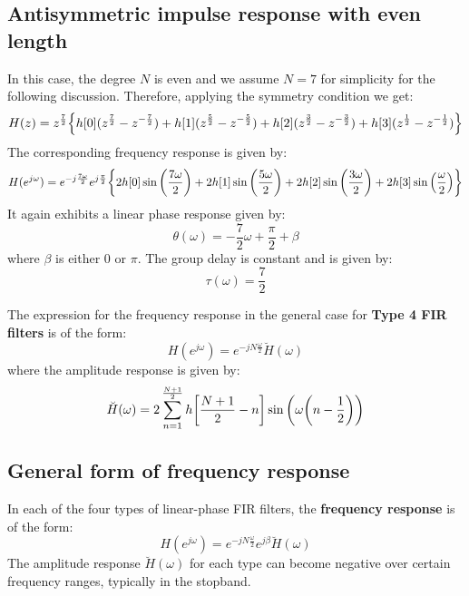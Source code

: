 \documentclass[../../main/main.tex]{subfiles}
\begin{document}
\subsection{Antisymmetric impulse response with even length}
In this case, the degree \( N \) is even and we assume \( N = 7 \) for simplicity for the following discussion. Therefore, applying the symmetry condition we get:
\begin{equation}
    H(z)
    =
    z^{\frac{7}{2}}\qty{h[0](z^{\frac{7}{2}} - z^{-\frac{7}{2}}) + h[1](z^{\frac{5}{2}} - z^{-\frac{5}{2}}) + h[2](z^{\frac{3}{2}} - z^{-\frac{3}{2}}) + h[3](z^{\frac{1}{2}} - z^{-\frac{1}{2}})}
    \label{eq:L20_S31_1}
\end{equation}
The corresponding frequency response is given by:%
%
\begin{equation}
    H(e^{j\omega})
    =
    e^{-j\frac{7\omega}{2}} e^{j \frac{\pi}{2}} \qty{2h[0]\sin\qty(\frac{7\omega}{2}) + 2h[1]\sin\qty(\frac{5\omega}{2}) + 2h[2]\sin\qty(\frac{3\omega}{2}) + 2h[3]\sin\qty(\frac{\omega}{2})}
    \label{eq:L20_S32_1}
\end{equation}
It again exhibits a linear phase response given by:%
%
\begin{equation}
    \theta(\omega)
    =
    - \frac{7}{2} \omega + \frac{\pi}{2} + \beta
    \label{eq:L20_S32_2}
\end{equation}
where \( \beta \) is either \( 0 \) or \( \pi \). The group delay is constant and is given by:%
%
\begin{equation}
    \tau(\omega)
    =
    \frac{7}{2}
    \label{eq:L20_S33_1}
\end{equation}

The expression for the frequency response in the general case for \textbf{Type 4 FIR filters} is of the form:%
\begin{equation}
    H(e^{j\omega})
    =
    e^{-jN \frac{\omega}{2}} \breve{H}(\omega)
    \label{eq:L20_S33_2}
\end{equation}
where the amplitude response is given by:
\begin{equation}
    \breve{H}(\omega)
    =
    2 \sum_{n=1}^{\frac{N+1}{2}} h\qty[\frac{N+1}{2} - n] \sin\qty(\omega \qty(n - \frac{1}{2}))
    \label{eq:L20_S33_3}
\end{equation}



\subsection{General form of frequency response}
In each of the four types of linear-phase FIR filters, the \textbf{frequency response} is of the form:
\begin{equation}
    H(e^{j\omega})
    =
    e^{-jN \frac{\omega}{2}} e^{j\beta} \breve{H}(\omega)
    \label{eq:L20_S34_1}
\end{equation}
The amplitude response \( \breve{H}(\omega) \) for each type can become negative over certain frequency ranges, typically in the stopband.
\end{document}
